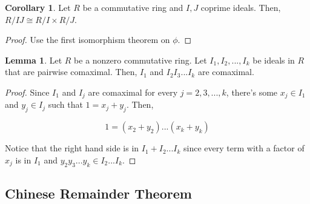 \documentclass{article}
\theoremstyle{definition}
\newtheorem{lemma}[theorem]{Lemma}
\newtheorem{corollary}{Corollary}[theorem]
\begin{document}
\begin{corollary}
    Let $R$ be a commutative ring and $I,J$ coprime ideals.
    Then, $R/IJ \cong R/I \times R/J$.
\end{corollary}
\begin{proof}
    Use the first isomorphism theorem on $\phi$.
\end{proof}

\begin{lemma}
    Let $R$ be a nonzero commutative ring. Let $I_{1},I_{2},...,I_{k}$ be ideals in $R$ that are pairwise comaximal.
    Then, $I_{1}$ and $I_{2}I_{3}...I_{k}$ are comaximal.
\end{lemma}
\begin{proof}
    Since $I_{1}$ and $I_{j}$ are comaximal for every $j = 2,3,...,k$, there's some $x_{j} \in I_{1}$
    and $y_{j} \in I_{j}$ such that $1 = x_{j} + y_{j}$. Then, 

    \[ 1 = (x_{2} + y_{2})...(x_{k} + y_{k}) \]

    Notice that the right hand side is in $I_{1} + I_{2}...I_{k}$ since every term with a
    factor of $x_{j}$ is in $I_{1}$ and $y_{2}y_{3}...y_{k} \in I_{2}...I_{k}$.
\end{proof}

\subsection{Chinese Remainder Theorem}
\end{document}
